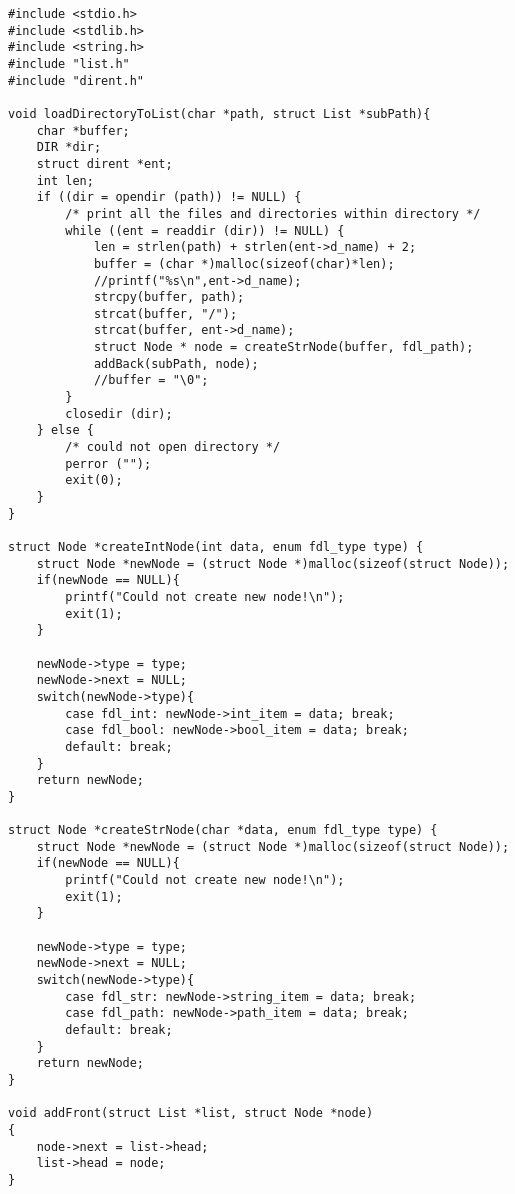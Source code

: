 \documentclass[11pt]{article}
\begin{document}
\begin{listing}[H]
  \begin{verbatim}
#include <stdio.h>
#include <stdlib.h>
#include <string.h>
#include "list.h"
#include "dirent.h"

void loadDirectoryToList(char *path, struct List *subPath){
    char *buffer;
    DIR *dir;
    struct dirent *ent;
    int len;
    if ((dir = opendir (path)) != NULL) {
        /* print all the files and directories within directory */
        while ((ent = readdir (dir)) != NULL) {
            len = strlen(path) + strlen(ent->d_name) + 2;
            buffer = (char *)malloc(sizeof(char)*len);
            //printf("%s\n",ent->d_name);
            strcpy(buffer, path);
            strcat(buffer, "/");
            strcat(buffer, ent->d_name);
            struct Node * node = createStrNode(buffer, fdl_path);
            addBack(subPath, node);
            //buffer = "\0";
        }
        closedir (dir);
    } else {
        /* could not open directory */
        perror ("");
        exit(0);
    }
}

struct Node *createIntNode(int data, enum fdl_type type) {
    struct Node *newNode = (struct Node *)malloc(sizeof(struct Node));
    if(newNode == NULL){
        printf("Could not create new node!\n");
        exit(1);
    }

    newNode->type = type;
    newNode->next = NULL;
    switch(newNode->type){
        case fdl_int: newNode->int_item = data; break;
        case fdl_bool: newNode->bool_item = data; break;
        default: break;
    }
    return newNode;
}

struct Node *createStrNode(char *data, enum fdl_type type) {
    struct Node *newNode = (struct Node *)malloc(sizeof(struct Node));
    if(newNode == NULL){
        printf("Could not create new node!\n");
        exit(1);
    }

    newNode->type = type;
    newNode->next = NULL;
    switch(newNode->type){
        case fdl_str: newNode->string_item = data; break;
        case fdl_path: newNode->path_item = data; break;
        default: break;
    }
    return newNode;
}

void addFront(struct List *list, struct Node *node)
{
    node->next = list->head;
    list->head = node;
}
  \end{verbatim}
\end{listing}
\end{document}
